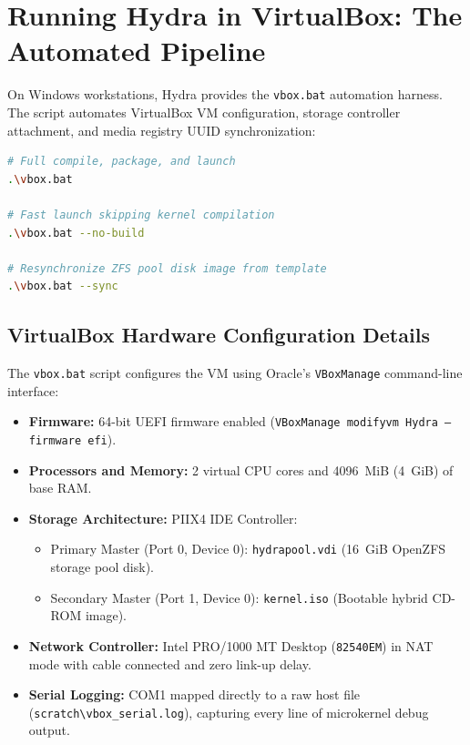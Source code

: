 \section{Running Hydra in VirtualBox: The Automated Pipeline}
\label{sec:virtualbox_pipeline}

On Windows workstations, Hydra provides the \texttt{vbox.bat} automation harness. The script automates VirtualBox VM configuration, storage controller attachment, and media registry UUID synchronization:

\begin{lstlisting}[language=bash, caption={VirtualBox Execution Commands}]
# Full compile, package, and launch
.\vbox.bat

# Fast launch skipping kernel compilation
.\vbox.bat --no-build

# Resynchronize ZFS pool disk image from template
.\vbox.bat --sync
\end{lstlisting}

\subsection{VirtualBox Hardware Configuration Details}
The \texttt{vbox.bat} script configures the VM using Oracle's \texttt{VBoxManage} command-line interface:
\begin{itemize}
    \item \textbf{Firmware:} 64-bit UEFI firmware enabled (\texttt{VBoxManage modifyvm Hydra --firmware efi}).
    \item \textbf{Processors and Memory:} 2 virtual CPU cores and 4096~MiB (4~GiB) of base RAM.
    \item \textbf{Storage Architecture:} PIIX4 IDE Controller:
    \begin{itemize}
        \item Primary Master (Port 0, Device 0): \texttt{hydrapool.vdi} (16~GiB OpenZFS storage pool disk).
        \item Secondary Master (Port 1, Device 0): \texttt{kernel.iso} (Bootable hybrid CD-ROM image).
    \end{itemize}
    \item \textbf{Network Controller:} Intel PRO/1000 MT Desktop (\texttt{82540EM}) in NAT mode with cable connected and zero link-up delay.
    \item \textbf{Serial Logging:} COM1 mapped directly to a raw host file (\texttt{scratch\textbackslash vbox\_serial.log}), capturing every line of microkernel debug output.
\end{itemize}

